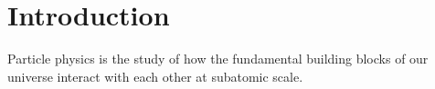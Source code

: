 \chapter{Introduction}
\label{ch:Introduction}

Particle physics is the study of how the fundamental building blocks of our universe interact with each other at subatomic scale. 

% 
% 
% 

